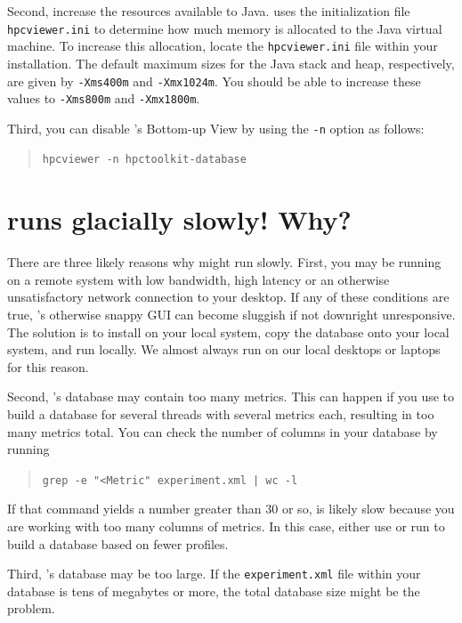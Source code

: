 \documentclass[11pt,letterpaper]{report}
\begin{document}
Second, increase the resources available to Java.
\hpcviewer{} uses the initialization file \texttt{hpcviewer.ini} to determine how much memory is allocated to the Java virtual machine.
To increase this allocation, locate the \texttt{hpcviewer.ini} file within your \hpcviewer{} installation.
The default maximum sizes for the Java stack and heap, respectively, are given by \texttt{-Xms400m} and \texttt{-Xmx1024m}.
You should be able to increase these values to \texttt{-Xms800m} and \texttt{-Xmx1800m}.

Third, you can disable \hpcviewer{}'s Bottom-up View by using the \texttt{-n} option as follows:
\begin{quote}
  \verb|hpcviewer -n hpctoolkit-database|
\end{quote}


\section{\hpcviewer{} runs glacially slowly! Why?}

There are three likely reasons why \hpcviewer{} might run slowly.
First, you may be running \hpcviewer{} on a remote system with low bandwidth, high latency or an otherwise unsatisfactory network connection to your desktop.
If any of these conditions are true, \hpcviewer{}'s otherwise snappy GUI can become sluggish if not downright unresponsive.
The solution is to install \hpcviewer{} on your local system, copy the database onto your local system, and run \hpcviewer{} locally.
We almost always run \hpcviewer{} on our local desktops or laptops for this reason.

Second, \HPCToolkit{}'s database may contain too many metrics.
This can happen if you use \hpcprof{} to build a database for several threads with several metrics each, resulting in too many metrics total.
You can check the number of columns in your database by running
\begin{quote}
  \verb,grep -e "<Metric" experiment.xml | wc -l,
\end{quote}
If that command yields a number greater than 30 or so, \hpcviewer{} is likely slow because you are working with too many columns of metrics.
In this case, either use \hpcprofmpi{} or run \hpcprof{} to build a database based on fewer profiles.

Third, \HPCToolkit{}'s database may be too large.
If the \texttt{experiment.xml} file within your database is tens of megabytes or more, the total database size might be the problem.
\end{document}
